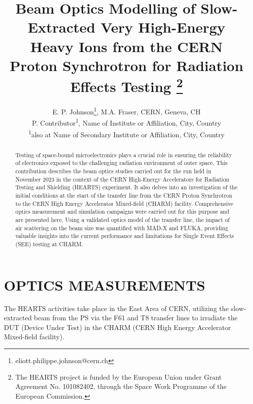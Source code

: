 \documentclass[a4paper,
               biblatex,     %
               ]{jacow}
\begin{document}
\title{Beam Optics Modelling of Slow-Extracted Very High-Energy Heavy Ions from the CERN Proton Synchrotron for Radiation Effects Testing \thanks{The HEARTS project is funded by the European Union under Grant Agreement No. 101082402, through the Space Work Programme of the European Commission.}}

\author{E. P. Johnson\thanks{eliott.philippe.johnson@cern.ch}, M.A. Fraser, CERN, Geneva, CH \\
		P. Contributor\textsuperscript{1}, Name of Institute or Affiliation, City, Country \\
		\textsuperscript{1}also at Name of Secondary Institute or Affiliation, City, Country}
	
\maketitle

%
\begin{abstract}
   Testing of space-bound microelectronics plays a crucial role in ensuring the reliability of electronics exposed to the challenging radiation environment of outer space. This contribution describes the beam optics studies carried out for the run held in November 2023 in the context of the CERN High-Energy Accelerators for Radiation Testing and Shielding (HEARTS) experiment. It also delves into an investigation of the initial conditions at the start of the transfer line from the CERN Proton Synchrotron to the CERN High Energy Accelerator Mixed-field (CHARM) facility. Comprehensive optics measurement and simulation campaigns were carried out for this purpose and are presented here. Using a validated optics model of the transfer line, the impact of air scattering on the beam size was quantified with MAD-X and FLUKA, providing valuable insights into the current performance and limitations for Single Event Effects (SEE) testing at CHARM.
\end{abstract}



\section{OPTICS MEASUREMENTS}

The HEARTS activities take place in the East Area of CERN, utilizing the slow-extracted beam from the PS via the F61 and T8 transfer lines to irradiate the DUT (Device Under Test) in the CHARM (CERN High Energy Accelerator Mixed-field facility).
\end{document}
